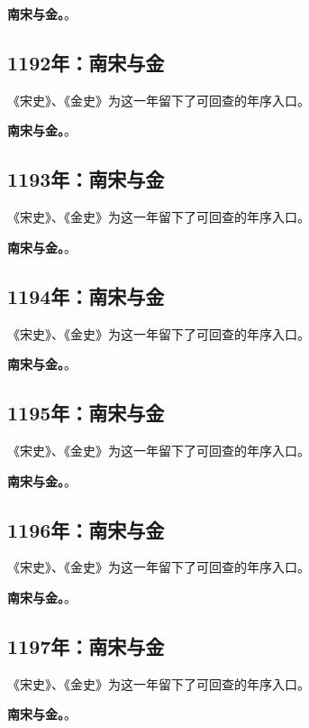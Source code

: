 \noindent\textbf{南宋与金。}。

\subsection{1192年：南宋与金}
《宋史》、《金史》为这一年留下了可回查的年序入口。

\noindent\textbf{南宋与金。}。

\subsection{1193年：南宋与金}
《宋史》、《金史》为这一年留下了可回查的年序入口。

\noindent\textbf{南宋与金。}。

\subsection{1194年：南宋与金}
《宋史》、《金史》为这一年留下了可回查的年序入口。

\noindent\textbf{南宋与金。}。

\subsection{1195年：南宋与金}
《宋史》、《金史》为这一年留下了可回查的年序入口。

\noindent\textbf{南宋与金。}。

\subsection{1196年：南宋与金}
《宋史》、《金史》为这一年留下了可回查的年序入口。

\noindent\textbf{南宋与金。}。

\subsection{1197年：南宋与金}
《宋史》、《金史》为这一年留下了可回查的年序入口。

\noindent\textbf{南宋与金。}。

